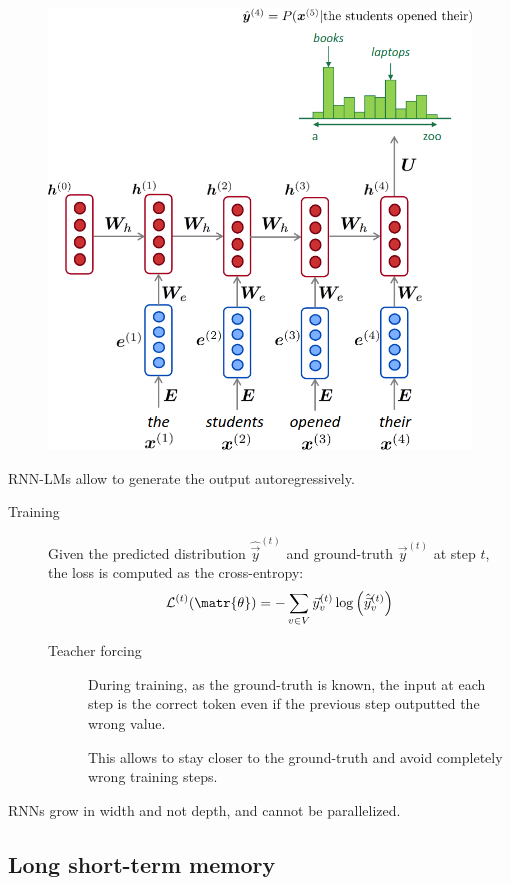 \begin{description}
    \begin{figure}[H]
        \centering
        \includegraphics[width=0.4\linewidth]{./img/rnn_lm.png}
    \end{figure}

    \begin{remark}
        RNN-LMs allow to generate the output autoregressively.
    \end{remark}

    \begin{description}
        \item[Training]
            Given the predicted distribution $\hat{\vec{y}}^{(t)}$ and ground-truth $\vec{y}^{(t)}$ at step $t$, the loss is computed as the cross-entropy:
            \[ \mathcal{L}^{(t)}(\matr{\theta}) = - \sum_{v \in V} \vec{y}_v^{(t)} \log\left( \hat{\vec{y}}_v^{(t)} \right) \]

            \begin{description}
                \item[Teacher forcing] 
                    During training, as the ground-truth is known, the input at each step is the correct token even if the previous step outputted the wrong value.

                    \begin{remark}
                        This allows to stay closer to the ground-truth and avoid completely wrong training steps.
                    \end{remark}
            \end{description}
    \end{description}
\end{description}

\begin{remark}
    RNNs grow in width and not depth, and cannot be parallelized.
\end{remark}


\subsection{Long short-term memory}

